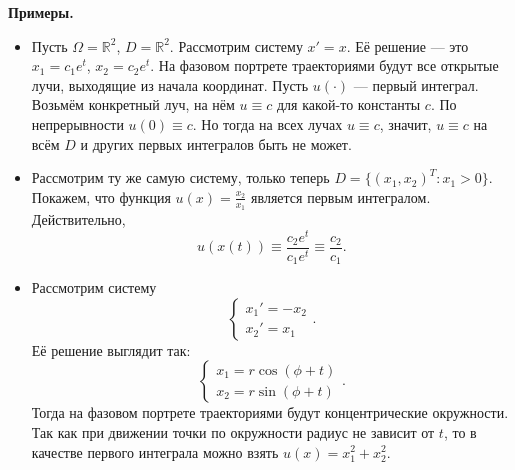 \QED

\textbf{Примеры.}
\begin{itemize}
    \item Пусть $\Omega = \mathbb{R}^2$, $D = \mathbb{R}^2$. Рассмотрим систему $x' = x$. Её решение --- это $x_1=c_1e^t$, $x_2=c_2e^t$.
    На фазовом портрете траекториями будут все открытые лучи, выходящие из начала координат. Пусть $u(\cdot)$ --- первый интеграл. Возьмём конкретный луч, на нём $u \equiv c$ для какой-то константы $c$.
    По непрерывности $u(0) \equiv c$. Но тогда на всех лучах $u \equiv c$, значит, $u \equiv c$ на всём $D$ и других первых интегралов быть не может.
    \item Рассмотрим ту же самую систему, только теперь $D = \{(x_1, x_2)^T : x_1 > 0\}$. Покажем, что функция $u(x) = \frac{x_2}{x_1}$ является первым интегралом. Действительно,
    \[
        u(x(t)) \equiv \frac{c_2e^t}{c_1e^t} \equiv \frac{c_2}{c_1}.
    \]
    \item Рассмотрим систему
    \[
        \begin{cases}
            x_1' = -x_2 \\
            x_2' = x_1
        \end{cases}.
    \]
    Её решение выглядит так:
    \[
        \begin{cases}
            x_1 = r\cos(\phi+t)\\
            x_2 = r\sin(\phi+t)
        \end{cases}.
    \]
    Тогда на фазовом портрете траекториями будут концентрические окружности. Так как при движении точки по окружности радиус не зависит от $t$, то в качестве первого интеграла можно взять $u(x) = x_1^2 + x_2^2$.

\end{itemize}

